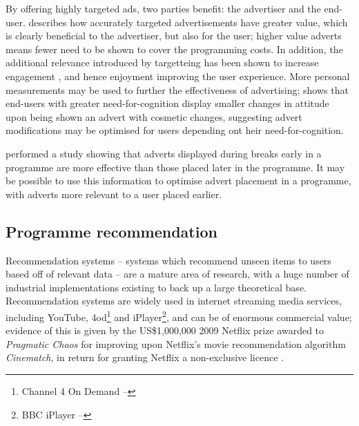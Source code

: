 	By offering highly targeted ads, two parties benefit: the advertiser and the end-user. \citet{advert_value} describes how accurately targeted advertisements have greater value, which is clearly beneficial to the advertiser, but also for the user; higher value adverts means fewer need to be shown to cover the programming costs. In addition, the additional relevance introduced by targetteing has been shown to increase engagement \citep{advertising_engagement}, and hence enjoyment \citep{yahoo-intrusive-advertising} improving the user experience. More personal measurements may be used to further the effectiveness of advertising; \citet{nettelhorst2012effects} shows that end-users with greater need-for-cognition display smaller changes in attitude upon being shown an advert with cosmetic changes, suggesting advert modifications may be optimised for users depending ont heir need-for-cognition.

	\citet{jeong2011position} performed a study showing that adverts displayed during breaks early in a programme are more effective than those placed later in the programme. It may be possible to use this information to optimise advert placement in a programme, with adverts more relevant to a user placed earlier.

\subsection{Programme recommendation}

	Recommendation systems -- systems which recommend unseen items to users based off of relevant data -- are a mature area of research, with a huge number of industrial implementations existing to back up a large theoretical base. Recommendation systems are widely used in internet streaming media services, including YouTube, 4od\footnote{Channel 4 On Demand -- } and iPlayer\footnote{BBC iPlayer -- }, and can be of enormous commercial value; evidence of this is given by the US\$1,000,000 2009 Netflix prize awarded to \textit{Pragmatic Chaos} for improving upon Netflix's movie recommendation algorithm \textit{Cinematch}, in return for granting Netflix a non-exclusive licence \citep{pragmatic_chaos}.

